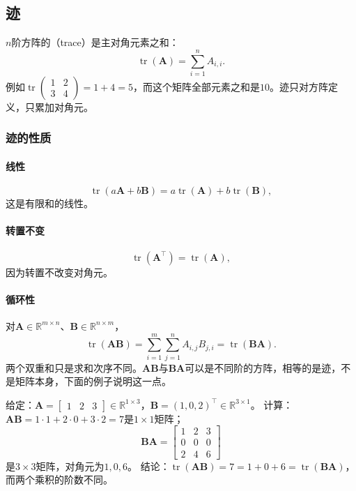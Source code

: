 \subsection{迹}
\label{sec:prelim-matrix-trace}

$n$阶方阵的（trace）是主对角元素之和：
\[
 \operatorname{tr}(\bm A)=\sum_{i=1}^n A_{i,i}.
\]
例如$\operatorname{tr}\left(\begin{smallmatrix}1&2\\3&4\end{smallmatrix}\right)=1+4=5$，而这个矩阵全部元素之和是$10$。迹只对方阵定义，只累加对角元。


\subsubsection{迹的性质}
\label{sec:ls-matrix-contractions}

\paragraph{线性}
\[
 \operatorname{tr}(a\bm A+b\bm B)=a\operatorname{tr}(\bm A)+b\operatorname{tr}(\bm B),
\]
这是有限和的线性。

\paragraph{转置不变}
\[
 \operatorname{tr}(\bm A^\top)=\operatorname{tr}(\bm A),
\]
因为转置不改变对角元。

\paragraph{循环性}
对$\bm A\in\mathbb R^{m\times n}$、$\bm B\in\mathbb R^{n\times m}$，
\begin{equation}
 \operatorname{tr}(\bm A\bm B)
 =\sum_{i=1}^m\sum_{j=1}^n A_{i,j}B_{j,i}
 =\operatorname{tr}(\bm B\bm A).
 \label{eq:linear-algebra-trace-cyclic}
\end{equation}
两个双重和只是求和次序不同。$\bm A\bm B$与$\bm B\bm A$可以是不同阶的方阵，相等的是迹，不是矩阵本身，下面的例子说明这一点。
\begin{example}[不同阶乘积的迹相等]
\label{ex:ls-trace-cyclic-different-sizes}
给定：$\bm A=\left[\begin{smallmatrix}1&2&3\end{smallmatrix}\right]\in\mathbb R^{1\times3}$，$\bm B=(1,0,2)^\top\in\mathbb R^{3\times1}$。
计算：$\bm A\bm B=1\cdot1+2\cdot0+3\cdot2=7$是$1\times1$矩阵；
\[
 \bm B\bm A=\begin{bmatrix}1&2&3\\0&0&0\\2&4&6\end{bmatrix}
\]
是$3\times3$矩阵，对角元为$1,0,6$。
结论：$\operatorname{tr}(\bm A\bm B)=7=1+0+6=\operatorname{tr}(\bm B\bm A)$，而两个乘积的阶数不同。
\end{example}

